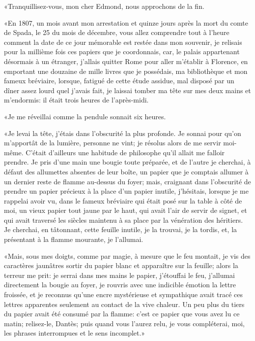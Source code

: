 «Tranquillisez-vous, mon cher Edmond, nous approchons de la fin.

«En 1807, un mois avant mon arrestation et quinze jours après la mort du comte de Spada, le 25 du mois de décembre, vous allez comprendre tout à l'heure comment la date de ce jour mémorable est restée dans mon souvenir, je relisais pour la millième fois ces papiers que je coordonnais, car, le palais appartenant désormais à un étranger, j'allais quitter Rome pour aller m'établir à Florence, en emportant une douzaine de mille livres que je possédais, ma bibliothèque et mon fameux bréviaire, lorsque, fatigué de cette étude assidue, mal disposé par un dîner assez lourd quel j'avais fait, je laissai tomber ma tête sur mes deux mains et m'endormis: il était trois heures de l'après-midi.

«Je me réveillai comme la pendule sonnait six heures.

«Je levai la tête, j'étais dans l'obscurité la plus profonde. Je sonnai pour qu'on m'apportât de la lumière, personne ne vint; je résolus alors de me servir moi-même. C'était d'ailleurs une habitude de philosophe qu'il allait me falloir prendre. Je pris d'une main une bougie toute préparée, et de l'autre je cherchai, à défaut des allumettes absentes de leur boîte, un papier que je comptais allumer à un dernier reste de flamme au-dessus du foyer; mais, craignant dans l'obscurité de prendre un papier précieux à la place d'un papier inutile, j'hésitais, lorsque je me rappelai avoir vu, dans le fameux bréviaire qui était posé sur la table à côté de moi, un vieux papier tout jaune par le haut, qui avait l'air de servir de signet, et qui avait traversé les siècles maintenu à sa place par la vénération des héritiers. Je cherchai, en tâtonnant, cette feuille inutile, je la trouvai, je la tordis, et, la présentant à la flamme mourante, je l'allumai.

«Mais, sous mes doigts, comme par magie, à mesure que le feu montait, je vis des caractères jaunâtres sortir du papier blanc et apparaître sur la feuille; alors la terreur me prit: je serrai dans mes mains le papier, j'étouffai le feu, j'allumai directement la bougie au foyer, je rouvris avec une indicible émotion la lettre froissée, et je reconnus qu'une encre mystérieuse et sympathique avait tracé ces lettres apparentes seulement au contact de la vive chaleur. Un peu plus du tiers du papier avait été consumé par la flamme: c'est ce papier que vous avez lu ce matin; relisez-le, Dantès; puis quand vous l'aurez relu, je vous compléterai, moi, les phrases interrompues et le sens incomplet.»

